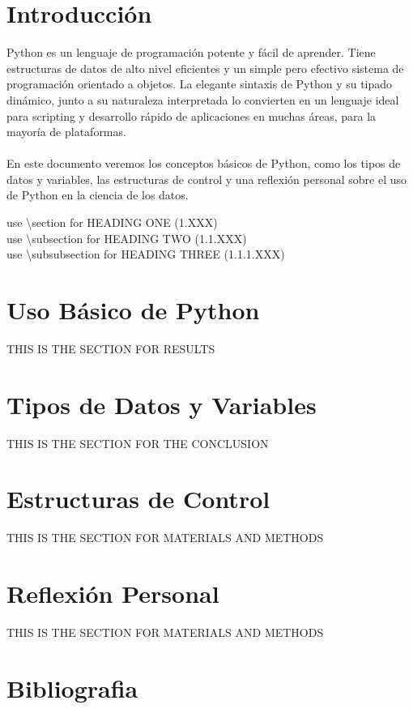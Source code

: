 \documentclass[a4paper, 12pt]{article}
\begin{document}

\clearpage
\tableofcontents
\listoffigures
\listoftables
\clearpage

\pagestyle{fancy}

\section{Introducción}
Python es un lenguaje de programación potente y fácil de aprender. Tiene estructuras de datos de alto nivel eficientes y un simple pero efectivo sistema de programación orientado a objetos. La elegante sintaxis de Python y su tipado dinámico, junto a su naturaleza interpretada lo convierten en un lenguaje ideal para scripting y desarrollo rápido de aplicaciones en muchas áreas, para la mayoría de plataformas.\cite{DocumentationPython}
\\
\\
En este documento veremos los conceptos básicos de Python, como los tipos de datos y variables, las estructuras de control y una reflexión personal sobre el uso de Python en la ciencia de los datos.

use \textbackslash section for HEADING ONE (1.XXX)\\
use \textbackslash subsection for HEADING TWO (1.1.XXX)\\
use \textbackslash subsubsection for HEADING THREE (1.1.1.XXX)

\clearpage
\section{Uso Básico de Python}
THIS IS THE SECTION FOR RESULTS

\clearpage
\section{Tipos de Datos y Variables}
THIS IS THE SECTION FOR THE CONCLUSION

\clearpage
\section{Estructuras de Control}
THIS IS THE SECTION FOR MATERIALS AND METHODS

\clearpage
\section{Reflexión Personal}
THIS IS THE SECTION FOR MATERIALS AND METHODS

\clearpage
\section{Bibliografia}
\printbibliography
\end{document}
